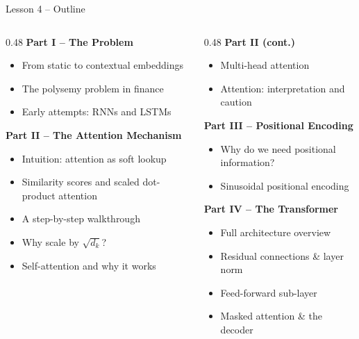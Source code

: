 \documentclass[aspectratio=169]{beamer}
\begin{document}
\begin{frame}{Lesson 4 – Outline}
  \begin{columns}[t]
    \begin{column}{0.48\textwidth}
      \textbf{Part I – The Problem}
      \begin{itemize}
        \item From static to contextual embeddings
        \item The polysemy problem in finance
        \item Early attempts: RNNs and LSTMs
      \end{itemize}
      \vspace{0.5em}
      \textbf{Part II – The Attention Mechanism}
      \begin{itemize}
        \item Intuition: attention as soft lookup
        \item Similarity scores and scaled dot-product attention
        \item A step-by-step walkthrough
        \item Why scale by $\sqrt{d_k}$?
        \item Self-attention and why it works
      \end{itemize}
    \end{column}
    \begin{column}{0.48\textwidth}
      \textbf{Part II (cont.)}
      \begin{itemize}
        \item Multi-head attention
        \item Attention: interpretation and caution
      \end{itemize}
      \vspace{0.5em}
      \textbf{Part III – Positional Encoding}
      \begin{itemize}
        \item Why do we need positional information?
        \item Sinusoidal positional encoding
      \end{itemize}
      \vspace{0.5em}
      \textbf{Part IV – The Transformer}
      \begin{itemize}
        \item Full architecture overview
        \item Residual connections \& layer norm
        \item Feed-forward sub-layer
        \item Masked attention \& the decoder
      \end{itemize}
    \end{column}
  \end{columns}
\end{frame}
%
\end{document}
